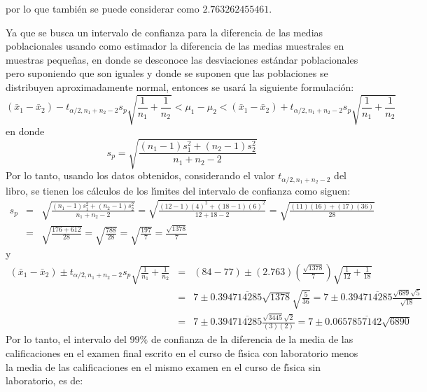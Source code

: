\begin{solucion}
 \vspace{-0.5cm}
 por lo que tambi\'en se puede considerar como $2.763262455461$.
 \par 
 Ya que se busca un intervalo de confianza para la diferencia de las medias poblacionales usando como estimador la diferencia de las medias muestrales en muestras peque\~nas, en donde se desconoce las desviaciones est\'andar poblacionales pero suponiendo que son iguales y donde se suponen que las poblaciones se distribuyen aproximadamente normal, entonces se usar\'a la siguiente formulaci\'on:
 \begin{equation*}
  \left( \bar{x}_1 - \bar{x}_2 \right) - t_{\alpha/2,n_1+n_2-2}s_p\sqrt{\frac{1}{n_1} + \frac{1}{n_2}} < \mu_1 - \mu_2 < \left( \bar{x}_1 - \bar{x}_2 \right) + t_{\alpha/2,n_1+n_2-2}s_p\sqrt{\frac{1}{n_1} + \frac{1}{n_2}}
 \end{equation*}
 en donde
 \begin{equation*}
  s_p = \sqrt{\frac{(n_1 - 1)s_1^2 + (n_2 - 1)s_2^2}{n_1 + n_2 - 2}}
 \end{equation*}
 Por lo tanto, usando los datos obtenidos, considerando el valor $t_{\alpha/2,n_1+n_2-2}$ del libro, se tienen los c\'alculos de los l\'{\i}mites del intervalo de confianza como siguen:
 \begin{eqnarray*}
  s_p & = & \sqrt{\frac{(n_1 - 1)s_1^2 + (n_2 - 1)s_2^2}{n_1 + n_2 - 2}} = \sqrt{\frac{(12-1)(4)^2 + (18-1)(6)^2}{12+18-2}} =\sqrt{\frac{(11)(16)+(17)(36)}{28}} \\
  & = & \sqrt{\frac{176+612}{28}} = \sqrt{\frac{788}{28}} = \sqrt{\frac{197}{7}} = \frac{\sqrt{1378}}{7}
 \end{eqnarray*}
 y
 \begin{eqnarray*}
  \left( \bar{x}_1 - \bar{x}_2 \right) \pm t_{\alpha/2,n_1+n_2-2}s_p\sqrt{\frac{1}{n_1} + \frac{1}{n_2}} & = & (84-77) \pm (2.763)\left( \frac{\sqrt{1378}}{7} \right) \sqrt{\frac{1}{12}+\frac{1}{18}} \\
  & = & 7 \pm 0.394\overline{714285} \sqrt{1378}\sqrt{\frac{5}{36}} = 7 \pm 0.394\overline{714285} \frac{\sqrt{689}\sqrt{5}}{\sqrt{18}} \\ 
  & = & 7 \pm 0.394\overline{714285}\frac{\sqrt{3445}\sqrt{2}}{(3)(2)} = 7 \pm 0.0657\overline{857142} \sqrt{6890}
 \end{eqnarray*}
 Por lo tanto, el intervalo del $99\%$ de confianza de la diferencia de la media de las calificaciones en el examen final escrito en el curso de f\'{\i}sica con laboratorio menos la media de las calificaciones en el mismo examen en el curso de f\'{\i}sica sin laboratorio, es de:

\end{solucion}
